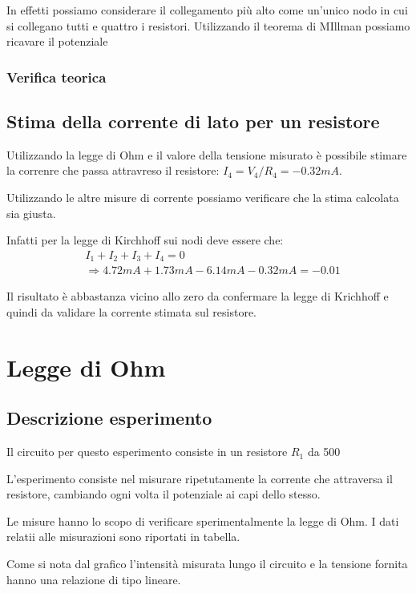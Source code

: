 \documentclass{article}
\begin{document}
In effetti possiamo considerare il collegamento più alto come un'unico nodo in cui si collegano tutti e quattro i resistori.
Utilizzando il teorema di MIllman possiamo ricavare il potenziale

\subsubsection{Verifica teorica}

\subsection{Stima della corrente di lato per un resistore}


Utilizzando la legge di Ohm e il valore della tensione misurato è possibile stimare la correnre che passa attravreso il resistore: \(I_4 = V_4 / R_4 = - 0.32 mA\).

Utilizzando le altre misure di corrente possiamo verificare che la stima calcolata sia giusta.

Infatti per la legge di Kirchhoff sui nodi deve essere che:
\[
\begin{aligned}
  &I_1 + I_2 + I_3 + I_4 = 0 \\
    &\Rightarrow  4.72 mA + 1.73 mA - 6.14 mA - 0.32 mA = -0.01
\end{aligned}
\]

Il risultato è abbastanza vicino allo zero da confermare la legge di Krichhoff e quindi da validare la corrente stimata sul resistore.

\section{Legge di Ohm}
\subsection{Descrizione esperimento}

Il circuito per questo esperimento consiste in un resistore \(R_1\) da 500 %

L'esperimento consiste nel misurare ripetutamente la corrente che attraversa il resistore, cambiando ogni volta il potenziale ai capi dello stesso.

Le misure hanno lo scopo di verificare sperimentalmente la legge di Ohm.
I dati relatii alle misurazioni sono riportati in tabella.



Come si nota dal grafico l'intensità misurata lungo il circuito e la tensione fornita hanno una relazione di tipo lineare.
\end{document}
